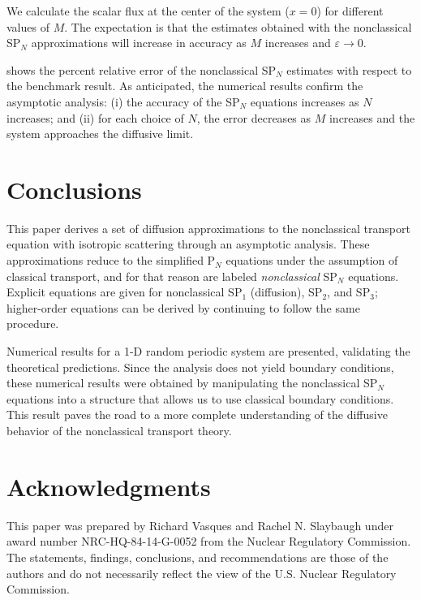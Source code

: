 \documentclass{anstrans}
\newcommand{\ep}{\varepsilon}
\begin{document}
We calculate the scalar flux at the center of the system ($x=0$) for different values of $M$. 
The expectation is that the estimates obtained with the nonclassical SP$_N$ approximations will increase in accuracy as $M$ increases and $\ep\rightarrow 0$.

 shows the percent relative error of the nonclassical SP$_N$ estimates with respect to the benchmark result.
As anticipated, the numerical results confirm the asymptotic analysis: (i) the accuracy of the SP$_N$ equations increases as $N$ increases; and (ii) for each choice of $N$, the error decreases as $M$ increases and the system approaches the diffusive limit.


\section{Conclusions}
This paper derives a set of diffusion approximations to the nonclassical transport equation with isotropic scattering through an asymptotic analysis.
These approximations reduce to the simplified P$_N$ equations under the assumption of classical transport, and for that reason are labeled \textit{nonclassical} SP$_N$ equations.
Explicit equations are given for nonclassical SP$_1$ (diffusion), SP$_2$, and SP$_3$; higher-order equations can be derived by continuing to follow the same procedure.

Numerical results for a 1-D random periodic system are presented, validating the theoretical predictions.
Since the analysis does not yield boundary conditions, these numerical results were obtained by manipulating the nonclassical SP$_N$ equations into a structure that allows us to use classical boundary conditions.
This result paves the road to a more complete understanding of the diffusive behavior of the nonclassical transport theory.

\section{Acknowledgments}
This paper was prepared by Richard Vasques and Rachel N. Slaybaugh under award number NRC-HQ-84-14-G-0052 from the Nuclear Regulatory Commission.
The statements, findings, conclusions, and recommendations are those of the authors and do not necessarily reflect the view of the U.S. Nuclear Regulatory Commission.



\end{document}
